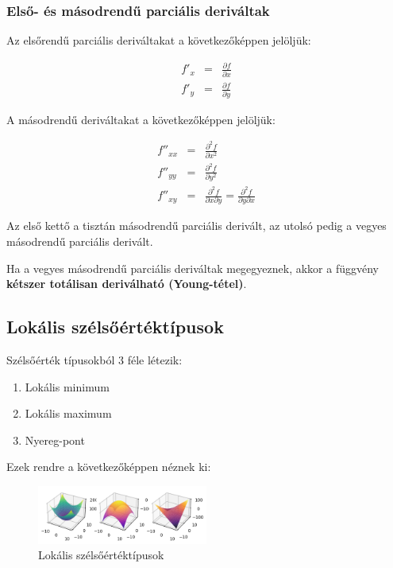 \documentclass{article}
\begin{document}
\subsubsection{Első- és másodrendű parciális deriváltak}

Az elsőrendű parciális deriváltakat a következőképpen jelöljük:

\begin{eqnarray*}
    f'_x &=& \frac{\partial f}{\partial x} \\
    f'_y &=& \frac{\partial f}{\partial y}
\end{eqnarray*}

A másodrendű deriváltakat a következőképpen jelöljük:

\begin{eqnarray*}
    f''_{xx} &=& \frac{\partial^2 f}{\partial x^2} \\
    f''_{yy} &=& \frac{\partial^2 f}{\partial y^2} \\
    f''_{xy} &=& \frac{\partial^2 f}{\partial x \partial y} = \frac{\partial^2 f}{\partial y \partial x}
\end{eqnarray*}

Az első kettő a tisztán másodrendű parciális derivált, az utolsó pedig a vegyes másodrendű parciális derivált.

Ha a vegyes másodrendű parciális deriváltak megegyeznek, akkor a függvény \textbf{kétszer totálisan deriválható (Young-tétel)}.

\subsection{Lokális szélsőértéktípusok}

Szélsőérték típusokból 3 féle létezik:

\begin{enumerate}
    \item Lokális minimum
    \item Lokális maximum
    \item Nyereg-pont
\end{enumerate}

Ezek rendre a következőképpen néznek ki:

\begin{figure}[h]
    \centering
    \includegraphics[width=0.5\textwidth]{pics/szelsoertek.png}
    \caption{Lokális szélsőértéktípusok}
    \label{fig:szelsoertek}
\end{figure}
\end{document}
